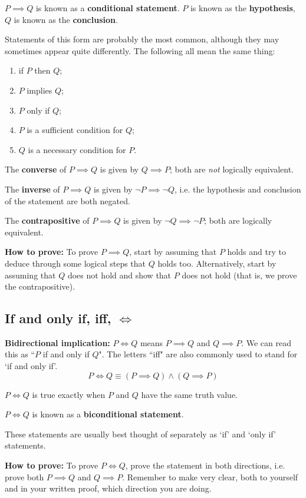 $P \implies Q$ is known as a \textbf{conditional statement}. $P$ is known as the \textbf{hypothesis}, $Q$ is known as the \textbf{conclusion}.

Statements of this form are probably the most common, although they may sometimes appear quite differently. The following all mean the same thing:
\begin{enumerate}[label=(\roman*)]
\item if $P$ then $Q$;
\item $P$ implies $Q$;
\item $P$ only if $Q$;
\item $P$ is a sufficient condition for $Q$;
\item $Q$ is a necessary condition for $P$.
\end{enumerate}

The \textbf{converse} of $P \implies Q$ is given by $Q \implies P$; both are \emph{not} logically equivalent.

The \textbf{inverse} of $P \implies Q$ is given by $\lnot P \implies \lnot Q$, i.e. the hypothesis and conclusion of the statement are both negated.

The \textbf{contrapositive} of $P \implies Q$ is given by $\lnot Q \implies \lnot P$; both are logically equivalent.

\textbf{How to prove:} To prove $P \implies Q$, start by assuming that $P$ holds and try to deduce through some logical steps that $Q$ holds too. Alternatively, start by assuming that $Q$ does not hold and show that $P$ does not hold (that is, we prove the contrapositive).
\pagebreak

\subsection{If and only if, iff, $\iff$}
\textbf{Bidirectional implication:} $P \iff Q$ means $P \implies Q$ and $Q \implies P$. We can read this as ``$P$ if and only if $Q$". The letters ``iff" are also commonly used to stand for ‘if and only if’.
\[ P \iff Q \equiv (P \implies Q) \land (Q \implies P) \]

$P \iff Q$ is true exactly when $P$ and $Q$ have the same truth value.

$P \iff Q$ is known as a \textbf{biconditional statement}.

These statements are usually best thought of separately as ‘if’ and ‘only if’ statements.

\textbf{How to prove:} To prove $P \iff Q$, prove the statement in both directions, i.e. prove both $P \implies Q$ and $Q \implies P$. Remember to make very clear, both to yourself and in your written proof, which direction you are doing.
\pagebreak


